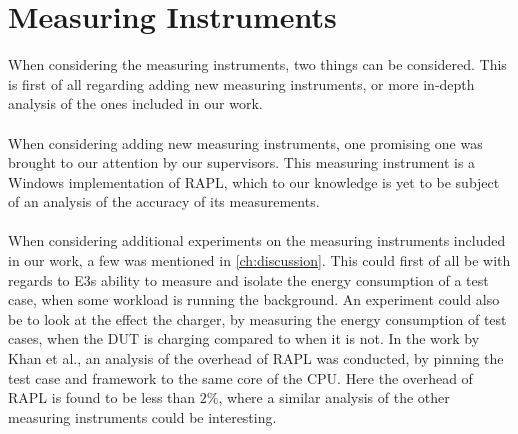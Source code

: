 \section{Measuring Instruments}

When considering the measuring instruments, two things can be considered. This is first of all regarding adding new measuring instruments, or more in-depth analysis of the ones included in our work.

\paragraph*{}
When considering adding new measuring instruments, one promising one was brought to our attention by our supervisors. This measuring instrument is a Windows implementation of RAPL, which to our knowledge is yet to be subject of an analysis of the accuracy of its measurements.

\paragraph*{}
When considering additional experiments on the measuring instruments included in our work, a few was mentioned in \cref{ch:discussion}. This could first of all be with regards to E3s ability to measure and isolate the energy consumption of a test case, when some workload is running the background. An experiment could also be to look at the effect the charger, by measuring the energy consumption of test cases, when the DUT is charging compared to when it is not. In the work by Khan et al.\cite[]{RAPL_in_action}, an analysis of the overhead of RAPL was conducted, by pinning the test case and framework to the same core of the CPU. Here the overhead of RAPL is found to be less than $2\%$, where a similar analysis of the other measuring instruments could be interesting.